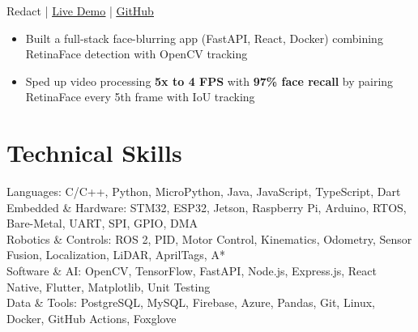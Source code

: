 \documentclass[11pt]{article}       %
\newcommand{\textsb}[1]{{\fontseries{sb}\selectfont #1}}
\begin{document}
\vspace{6pt}

\textsb{Redact} | \href{https://redact.sunnoah.ca}{\underline{Live Demo}} | \href{https://github.com/LegendaryArk/Redact}{\underline{GitHub}}
\begin{itemize}
    \item Built a full-stack face-blurring app (FastAPI, React, Docker) combining RetinaFace detection with OpenCV tracking
    \item Sped up video processing \textbf{5x to 4 FPS} with \textbf{97\% face recall} by pairing RetinaFace every 5th frame with IoU tracking
\end{itemize}



\section*{Technical Skills}
\textsb{Languages:} C/C++, Python, MicroPython, Java, JavaScript, TypeScript, Dart \\[-1pt]
\textsb{Embedded \& Hardware:} STM32, ESP32, Jetson, Raspberry Pi, Arduino, RTOS, Bare-Metal, UART, SPI, GPIO, DMA \\[-1pt]
\textsb{Robotics \& Controls:} ROS 2, PID, Motor Control, Kinematics, Odometry, Sensor Fusion, Localization, LiDAR, AprilTags, A* \\[-1pt]
\textsb{Software \& AI:} OpenCV, TensorFlow, FastAPI, Node.js, Express.js, React Native, Flutter, Matplotlib, Unit Testing \\[-1pt]
\textsb{Data \& Tools:} PostgreSQL, MySQL, Firebase, Azure, Pandas, Git, Linux, Docker, GitHub Actions, Foxglove
\end{document}
